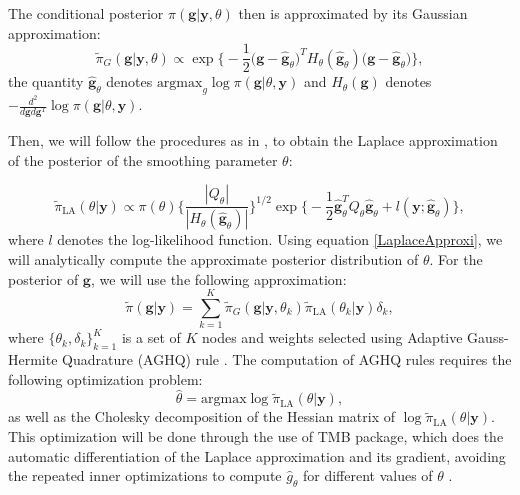 \documentclass{article}
\begin{document}
The conditional posterior $\pi(\boldsymbol{g}|\boldsymbol{y},\theta)$ then is approximated by its Gaussian approximation:
\begin{equation}\label{GaussianApproxi}
\tilde{\pi}_G(\boldsymbol{g}|\boldsymbol{y},\theta) \propto \exp \bigg\{ -\frac{1}{2} \bigg(\boldsymbol{g} - \hat{\boldsymbol{g}}_\theta \bigg)^T H_\theta (\hat{\boldsymbol{g}}_\theta) \bigg(\boldsymbol{g} - \hat{\boldsymbol{g}}_\theta \bigg) \bigg\},
\end{equation}
the quantity $\hat{\boldsymbol{g}}_\theta$ denotes $\text{argmax}_g \log \pi (\boldsymbol{g} | \theta, \boldsymbol{y})$ and $H_\theta (\boldsymbol{g})$ denotes $-\frac{d^2}{d\boldsymbol{g}d\boldsymbol{g}^T} \log \pi(\boldsymbol{g} | \theta, \boldsymbol{y})$.

Then, we will follow the procedures as in \cite{tierney1986accurate}, to obtain the Laplace approximation of the posterior of the smoothing parameter $\theta$:

\begin{equation}\label{LaplaceApproxi}
\tilde{\pi}_\text{LA}(\theta|\boldsymbol{y}) \propto \pi(\theta) \bigg\{\frac{|Q_\theta|}{|H_\theta(\hat{\boldsymbol{g}}_\theta)|} \bigg\}^{1/2} \exp \bigg\{ -\frac{1}{2}  \hat{\boldsymbol{g}}_\theta^T Q_\theta  \hat{\boldsymbol{g}}_\theta + l(\boldsymbol{y};\hat{\boldsymbol{g}}_\theta) \bigg\},
\end{equation}
where $l$ denotes the log-likelihood function. Using equation \ref{LaplaceApproxi}, we will analytically compute the approximate posterior distribution of $\theta$. For the posterior of $\boldsymbol{g}$, we will use the following approximation:
\begin{equation}\label{finalApproxi}
\tilde{\pi}(\boldsymbol{g}|\boldsymbol{y}) = \sum_{k=1}^K \tilde{\pi}_G(\boldsymbol{g}|\boldsymbol{y}, \theta_k) \tilde{\pi}_{\text{LA}}(\theta_k|\boldsymbol{y}) \delta_k,
\end{equation}
where $\{\theta_k, \delta_k\}_{k=1}^K$ is a set of $K$ nodes and weights selected using Adaptive Gauss-Hermite Quadrature (AGHQ) rule \citep{aghq}. The computation of AGHQ rules requires the following optimization problem:
\begin{equation}\label{optimLap}
\hat{\theta} = \text{argmax}\log\tilde{\pi}_{\text{LA}}(\theta|\boldsymbol{y}),
\end{equation}
as well as the Cholesky decomposition of the Hessian matrix of $\log\tilde{\pi}_{\text{LA}}(\theta|\boldsymbol{y})$. This optimization will be done through the use of TMB package, which does the automatic differentiation of the Laplace approximation and its gradient, avoiding the repeated inner optimizations to compute $\hat{g}_\theta$ for different values of $\theta$ \citep{kristensen2015tmb}.
\end{document}
